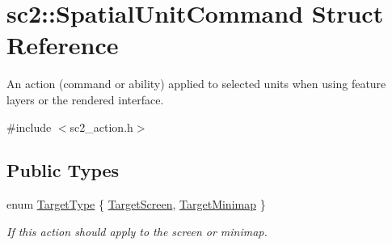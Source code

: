 \hypertarget{structsc2_1_1_spatial_unit_command}{}\section{sc2\+:\+:Spatial\+Unit\+Command Struct Reference}
\label{structsc2_1_1_spatial_unit_command}


An action (command or ability) applied to selected units when using feature layers or the rendered interface.  




{\ttfamily \#include $<$sc2\+\_\+action.\+h$>$}

\subsection*{Public Types}
\begin{DoxyCompactItemize}
\item 
enum \hyperlink{structsc2_1_1_spatial_unit_command_ad50a0bbdbaff9ef68fbda3d817d3a32e}{Target\+Type} \{ \hyperlink{structsc2_1_1_spatial_unit_command_ad50a0bbdbaff9ef68fbda3d817d3a32ea7f95fd3b8b1bbeb6221f223074dbbf9a}{Target\+Screen}, 
\hyperlink{structsc2_1_1_spatial_unit_command_ad50a0bbdbaff9ef68fbda3d817d3a32ea5c3cb6c9cf1642ef2579036167621b36}{Target\+Minimap}
 \}\begin{DoxyCompactList}\small\item\em If this action should apply to the screen or minimap. \end{DoxyCompactList}
\end{DoxyCompactItemize}
